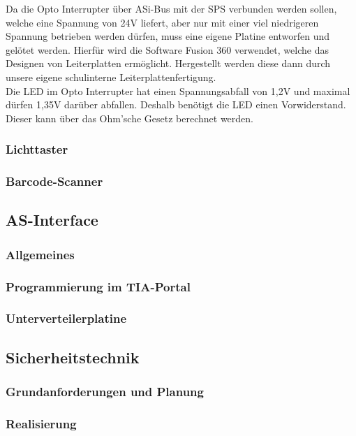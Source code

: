 Da die Opto Interrupter über ASi-Bus mit der SPS verbunden werden sollen, welche eine Spannung von 24V liefert, aber nur mit einer viel niedrigeren Spannung betrieben werden dürfen, muss eine eigene Platine entworfen und gelötet werden. Hierfür wird die Software Fusion 360 verwendet, welche das Designen von Leiterplatten ermöglicht. Hergestellt werden diese dann durch unsere eigene schulinterne Leiterplattenfertigung.\\

Die LED im Opto Interrupter hat einen Spannungsabfall von 1,2V und maximal dürfen 1,35V darüber abfallen. Deshalb benötigt die LED einen Vorwiderstand. Dieser kann über das Ohm'sche Gesetz berechnet werden.

\subsubsection{Lichttaster}

\subsubsection{Barcode-Scanner}

\subsection{AS-Interface}

\subsubsection{Allgemeines}

\subsubsection{Programmierung im TIA-Portal}

\subsubsection{Unterverteilerplatine}


\subsection{Sicherheitstechnik}
\subsubsection{Grundanforderungen und Planung}
\subsubsection{Realisierung}